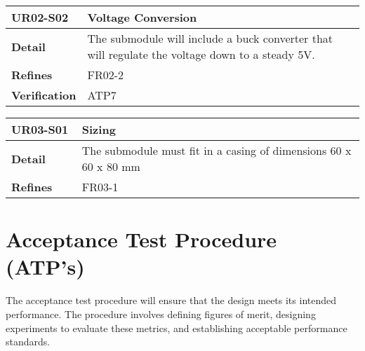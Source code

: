 \documentclass[class=report,11pt,crop=false]{standalone}
\begin{document}
 

\begin{table}
\centering

\begin{tabular}{|>{\raggedright\arraybackslash}p{0.2\linewidth}|>{\raggedright\arraybackslash}p{0.8\linewidth}|}
\hline
\textbf{UR02-S02} & \textbf{Voltage Conversion} \\
\hline
\textbf{Detail} & The submodule will include a buck converter that will regulate the voltage down to a steady 5V.  \\
\hline
\textbf{Refines} & FR02-2 \\
\hline
\textbf{Verification} & ATP7 \\
\hline

\end{tabular}

\end{table}

 

\begin{table}
\centering

\begin{tabular}{|>{\raggedright\arraybackslash}p{0.2\linewidth}|>{\raggedright\arraybackslash}p{0.8\linewidth}|}
\hline
\textbf{UR03-S01} & \textbf{Sizing} \\
\hline
\textbf{Detail} & The submodule must fit in a casing of dimensions 60 x 60 x 80 mm \\
\hline
\textbf{Refines} & FR03-1 \\
\hline

\end{tabular}

\end{table}

\section{Acceptance Test Procedure (ATP’s)}

The acceptance test procedure will ensure that the design meets its intended performance. The procedure involves defining figures of merit, designing experiments to evaluate these metrics, and establishing acceptable performance standards.
\end{document}
